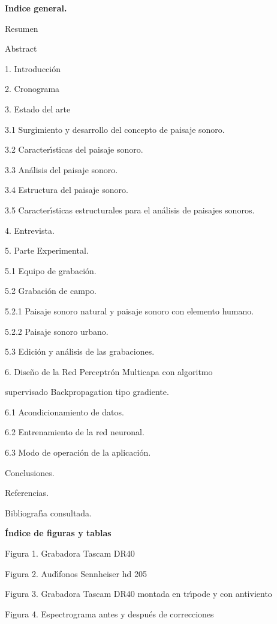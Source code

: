 \textbf{Indice general. }

Resumen 

Abstract

1. Introducci\'{o}n

2. Cronograma

3. Estado del arte

3.1 Surgimiento y desarrollo del concepto de paisaje sonoro.

3.2 Caracter\'{\i}sticas del paisaje sonoro.

3.3 An\'{a}lisis del paisaje sonoro.

3.4 Estructura del paisaje sonoro.

3.5 Caracter\'{\i}sticas estructurales para el an\'{a}lisis de paisajes
sonoros.

4. Entrevista.

5. Parte Experimental.

5.1 Equipo de grabaci\'{o}n.

5.2 Grabaci\'{o}n de campo.

5.2.1 Paisaje sonoro natural y paisaje sonoro con elemento humano.

5.2.2 Paisaje sonoro urbano.

5.3 Edici\'{o}n y an\'{a}lisis de las grabaciones.

6. Dise\~{n}o de la Red Perceptr\'{o}n Multicapa con algoritmo

supervisado Backpropagation tipo gradiente.

6.1 Acondicionamiento de datos.

6.2 Entrenamiento de la red neuronal.

6.3 Modo de operaci\'{o}n de la aplicaci\'{o}n.

Conclusiones.

Referencias.

Bibliograf\'{\i}a consultada.

\textbf{\'{I}ndice de figuras y tablas}

Figura 1. Grabadora Tascam DR40

Figura 2. Aud\'{\i}fonos Sennheiser hd 205

Figura 3. Grabadora Tascam DR40 montada en tr\'{\i}pode y con
antiviento

Figura 4. Espectrograma antes y despu\'{e}s de correcciones

